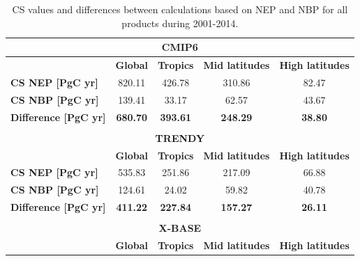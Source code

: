 \documentclass[10pt]{article}
\begin{document}
\begin{table}
\label{Table:CSdiff_NEP_NBP}
\caption{CS values and differences between calculations based on NEP and NBP for all products during 2001-2014.}
\centering
\begin{tabular}{lcccc}
\hline
\multicolumn{5}{c}{\textbf{CMIP6}}                                                                                       \\ \hline
\textbf{}                         & \textbf{Global}      & \textbf{Tropics}     & \textbf{Mid latitudes} & \textbf{High latitudes} \\
\textbf{CS NEP {[}PgC yr{]}}      & 820.11	             & 426.78	             & 310.86	                 & 82.47                 \\
\textbf{CS NBP {[}PgC yr{]}}      & 139.41	             & 33.17	            & 62.57                     & 43.67              \\ \hline
\textbf{Difference  {[}PgC yr{]}} & \textbf{680.70}     & \textbf{393.61}     & \textbf{248.29}       & \textbf{38.80}        \\ \hline
                                  & \multicolumn{1}{l}{} & \multicolumn{1}{l}{} & \multicolumn{1}{l}{}   & \multicolumn{1}{l}{}    \\ \hline
\multicolumn{5}{c}{\textbf{TRENDY}}                                                                                       \\ \hline
\textbf{}                         & \textbf{Global}      & \textbf{Tropics}     & \textbf{Mid latitudes} & \textbf{High latitudes} \\
\textbf{CS NEP {[}PgC yr{]}}      & 535.83	             & 251.86            	& 217.09	             & 66.88                   \\
\textbf{CS NBP {[}PgC yr{]}}      & 124.61	             & 24.02	            & 59.82	                 & 40.78                 \\ \hline
\textbf{Difference  {[}PgC yr{]}} & \textbf{411.22}      & \textbf{227.84}      & \textbf{157.27}        & \textbf{26.11}          \\ \hline
                                  & \multicolumn{1}{l}{} & \multicolumn{1}{l}{} & \multicolumn{1}{l}{}   & \multicolumn{1}{l}{}    \\
\hline
\multicolumn{5}{c}{\textbf{X-BASE}}                                                                                       \\ \hline
\textbf{}                         & \textbf{Global}      & \textbf{Tropics}     & \textbf{Mid latitudes} & \textbf{High latitudes} \\

\end{tabular}
\end{table}
\end{document}
